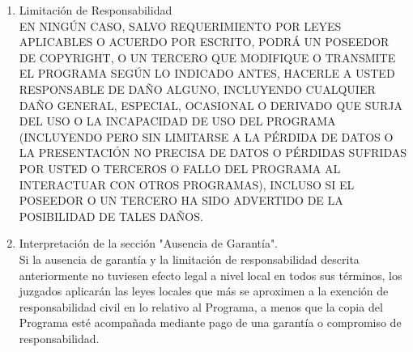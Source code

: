 \begin{enumerate}
		\item Limitación de Responsabilidad\\
		
		EN NINGÚN CASO, SALVO REQUERIMIENTO POR LEYES APLICABLES O ACUERDO POR ESCRITO, PODRÁ UN POSEEDOR DE COPYRIGHT, O UN TERCERO QUE MODIFIQUE O TRANSMITE EL PROGRAMA SEGÚN LO INDICADO ANTES, HACERLE A USTED RESPONSABLE DE DAÑO ALGUNO, INCLUYENDO CUALQUIER DAÑO GENERAL, ESPECIAL, OCASIONAL O DERIVADO QUE SURJA DEL USO O LA INCAPACIDAD DE USO DEL PROGRAMA (INCLUYENDO PERO SIN LIMITARSE A LA PÉRDIDA DE DATOS O LA PRESENTACIÓN NO PRECISA DE DATOS O PÉRDIDAS SUFRIDAS POR USTED O TERCEROS O FALLO DEL PROGRAMA AL INTERACTUAR CON OTROS PROGRAMAS), INCLUSO SI EL POSEEDOR O UN TERCERO HA SIDO ADVERTIDO DE LA POSIBILIDAD DE TALES DAÑOS.\\
		
		\item Interpretación de la sección "Ausencia de Garantía".\\
		
		Si la ausencia de garantía y la limitación de responsabilidad descrita anteriormente no tuviesen efecto legal a nivel local en todos sus términos, los juzgados aplicarán las leyes locales que más se aproximen a la exención de responsabilidad civil en lo relativo al Programa, a menos que la copia del Programa esté acompañada mediante pago de una garantía o compromiso de responsabilidad.\\
		
	\end{enumerate}
	
